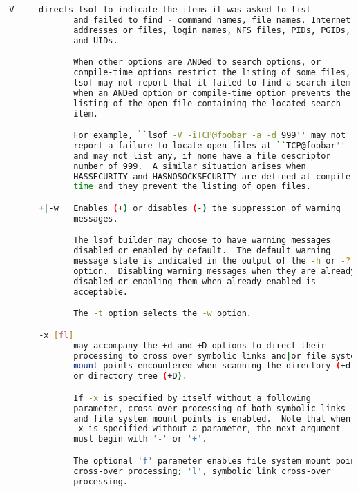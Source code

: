 {{\begin{lstlisting}[language=bash]
       -V     directs lsof to indicate the items it was asked to list
              and failed to find - command names, file names, Internet
              addresses or files, login names, NFS files, PIDs, PGIDs,
              and UIDs.

              When other options are ANDed to search options, or
              compile-time options restrict the listing of some files,
              lsof may not report that it failed to find a search item
              when an ANDed option or compile-time option prevents the
              listing of the open file containing the located search
              item.

              For example, ``lsof -V -iTCP@foobar -a -d 999'' may not
              report a failure to locate open files at ``TCP@foobar''
              and may not list any, if none have a file descriptor
              number of 999.  A similar situation arises when
              HASSECURITY and HASNOSOCKSECURITY are defined at compile
              time and they prevent the listing of open files.

       +|-w   Enables (+) or disables (-) the suppression of warning
              messages.

              The lsof builder may choose to have warning messages
              disabled or enabled by default.  The default warning
              message state is indicated in the output of the -h or -?
              option.  Disabling warning messages when they are already
              disabled or enabling them when already enabled is
              acceptable.

              The -t option selects the -w option.

       -x [fl]
              may accompany the +d and +D options to direct their
              processing to cross over symbolic links and|or file system
              mount points encountered when scanning the directory (+d)
              or directory tree (+D).

              If -x is specified by itself without a following
              parameter, cross-over processing of both symbolic links
              and file system mount points is enabled.  Note that when
              -x is specified without a parameter, the next argument
              must begin with '-' or '+'.

              The optional 'f' parameter enables file system mount point
              cross-over processing; 'l', symbolic link cross-over
              processing.


\end{lstlisting}}}
